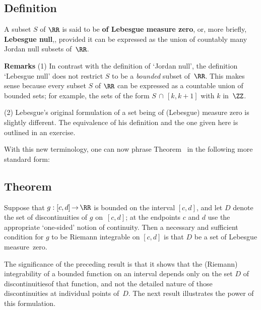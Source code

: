                 \subsection{\small{{\bf Definition}}}
                \label{DefH20.70}
\V

        A subset $S$ of ${\RR}$ is said to be {\bf of Lebesgue measure zero}, or, more briefly, {\bf Lebesgue null},,
    provided it can be expressed as the union of countably many Jordan null subsets of~${\RR}$.

\V

        {\bf Remarks} (1) In contrast with the definition of `Jordan null', the definition `Lebesgue null' does not restrict $S$ to be a {\em bounded} subset of~${\RR}$.
    This makes sense because every subset $S$ of ${\RR}$ can be expressed as a countable union of bounded sets; for example, the sets of the form $S\,{\cap}\,[k,k+1]$ with $k$ in~${\ZZ}$.

\V

        (2) Lebesgue's original formulation of a set being of (Lebesgue) measure zero is slightly different. The equivalence of his definition and the one given here is outlined in an exercise. %

\VV

        With this new terminology, one can now phrase Theorem~ in the following more standard form:

\V

        \subsection{\small{{\bf Theorem}}}
        \label{ThmH20.75A}

\V

        Suppose that $g:[c,d]\,{\rightarrow}\,{\RR}$ is bounded on the interval $[c,d]$, and let $D$ denote the set of discontinuities of $g$ on~$[c,d]$;
    at the endpoints $c$ and $d$ use the appropriate `one-sided' notion of continuity. Then a necessary and sufficient condition for $g$ to be Riemann integrable on $[c,d]$
    is that $D$ be a set of Lebesgue measure~zero.

\VV

        The significance of the preceding result is that it shows that the (Riemann) integrability of a bounded function on an interval depends only on the set $D$ of discontinuitiesof that function,
    and not the detailed nature of those discontinuities at individual points of~$D$. The next result illustrates the power of this formulation.

